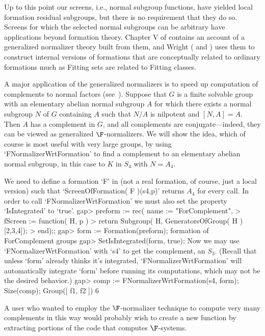 


Up to this point our screens, i.e., normal subgroup functions, have yielded local formation residual subgroups, but there is no requirement that they do so. Screens for which the selected normal subgroups can be arbitrary have applications beyond formation theory. Chapter V of \cite{CH} contains an account of a generalized normalizer theory built from them, and Wright (\cite{WA} and \cite{WB}) uses them to construct internal versions of formations that are conceptually related to ordinary formations much as Fitting sets are related to Fitting classes.

A major application of the generalized normalizers is to speed up computation of complements to normal factors (see~\cite{EW}).
Suppose that $G$ is a finite solvable group with an elementary abelian
normal subgroup $A$ for which there exists a normal subgroup $N$ of $G$
containing $A$ such that $N/A$ is nilpotent and $[N,A] = A$. Then $A$ has a complement in $G$, and all complements
are conjugate---indeed, they can be viewed as generalized
$\F$-normalizers. We will show the idea, which of course is most useful with very large groups, by using `FNormalizerWrtFormation' to find a complement to an
elementary abelian normal subgroup, in this case to $K$ in $S_4$ with $N =
A_4$. 

We need to define a formation `F' in {\GAP} (not a real formation,
of course, just a local version) such that `ScreenOfFormation( F )(s4,p)' returns $A_4$ for
every call. In order to call `FNormalizerWrtFormation' we must also set the property
`IsIntegrated' to `true'.
\beginexample
gap> preform := rec( name := "ForComplement",
> fScreen := function( H, p )
> return Subgroup( H, GeneratorsOfGroup( H ){[2,3,4]});
> end);;
gap> form := Formation(preform);
formation of ForComplement groups 
gap> SetIsIntegrated(form, true);
\endexample
Now we may use  `FNormalizerWrtFormation'  with `s4' to
get the complement, an $S_3$. (Recall that unless `form' already
thinks it's integrated, `FNormalizerWrtFormation' will automatically
integrate `form' before running its computations, which may not be
the desired behavior.)
\beginexample
gap> comp := FNormalizerWrtFormation(s4, form); Size(comp);
Group([ f1, f2 ])
6
\endexample

A user who wanted to employ the $\F$-normalizer technique to compute very
many complements in this way would probably wish to create a new {\GAP}
function by extracting portions of the code that computes
$\F$-systems. 


